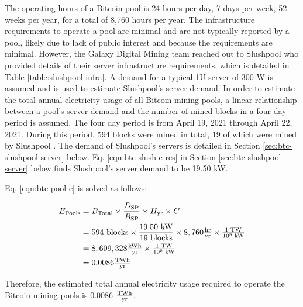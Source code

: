 The operating hours of a Bitcoin pool is 24 hours per day, 7 days per week, 52 weeks per year, for a total of 8,760 hours per year.
The infrastructure requirements to operate a pool are minimal and are not typically reported by a pool, likely due to lack of public interest and because the requirements are minimal.
However, the Galaxy Digital Mining team reached out to Slushpool who provided details of their server infrastructure requirements, which is detailed in Table \ref{table:slushpool-infra}.
A demand for a typical 1U server of 300 W is assumed \cite{1u-power} and is used to estimate Slushpool's server demand.
In order to estimate the total annual electricity usage of all Bitcoin mining pools, a linear relationship between a pool's server demand and the number of mined blocks in a four day period is assumed.
The four day period is from April 19, 2021 through April 22, 2021.
During this period, 594 blocks were mined in total, 19 of which were mined by Slushpool \cite{mined-blocks}.
The demand of Slushpool's servers is detailed in Section \ref{sec:btc-slushpool-server} below.
Eq. \eqref{eqn:btc-slush-e-res} in Section \ref{sec:btc-slushpool-server} below finds Slushpool's server demand to be 19.50 kW.

Eq. \eqref{eqn:btc-pool-e} is solved as follows:

\begin{align}\label{eqn:btc-pool-e-rew}
  E_\textrm{Pools} &= B_\textrm{Total} \times \frac{D_\textrm{SP}}{B_\textrm{SP}} \times H_\textrm{yr} \times C \\
                   &= 594 \textrm{ blocks}\times \frac{19.50 \textrm{ kW}}{19 \textrm{ blocks}} \times 8,760 \tfrac{ \textrm{hr} } { \textrm{yr} } \times \tfrac{1 \textrm{ TW} } { 10^9 \textrm{ kW}} \nonumber \\
                   &= 8,609,328 \tfrac{ \textrm{kWh} } { \textrm{yr} } \times \tfrac{1 \textrm{ TW} } { 10^9 \textrm{ kW}} \nonumber \\
                   &= 0.0086 \tfrac{ \textrm{{T}Wh} } { \textrm{yr} } 
\end{align}

Therefore, the estimated total annual electricity usage required to operate the Bitcoin mining pools is 0.0086 $\tfrac{ \textrm{{T}Wh} } { \textrm{yr} }$.
